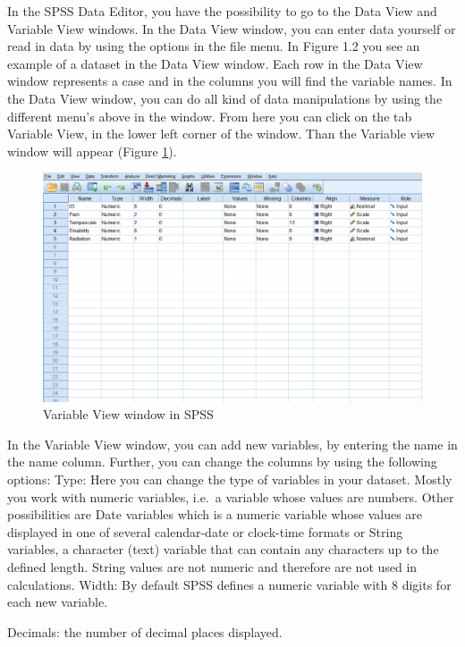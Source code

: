 \documentclass[]{book}
\begin{document}
In the SPSS Data Editor, you have the possibility to go to the Data View
and Variable View windows. In the Data View window, you can enter data
yourself or read in data by using the options in the file menu. In
Figure 1.2 you see an example of a dataset in the Data View window. Each
row in the Data View window represents a case and in the columns you
will find the variable names. In the Data View window, you can do all
kind of data manipulations by using the different menu's above in the
window. From here you can click on the tab Variable View, in the lower
left corner of the window. Than the Variable view window will appear
(Figure \ref{fig:fig3}).

\begin{figure}

{\centering \includegraphics[width=0.9\linewidth]{images/fig1.3} 

}

\caption{Variable View window in SPSS}\label{fig:fig3}
\end{figure}

In the Variable View window, you can add new variables, by entering the
name in the name column. Further, you can change the columns by using
the following options: Type: Here you can change the type of variables
in your dataset. Mostly you work with numeric variables, i.e.~a variable
whose values are numbers. Other possibilities are Date variables which
is a numeric variable whose values are displayed in one of several
calendar-date or clock-time formats or String variables, a character
(text) variable that can contain any characters up to the defined
length. String values are not numeric and therefore are not used in
calculations. Width: By default SPSS defines a numeric variable with 8
digits for each new variable.

Decimals: the number of decimal places displayed.
\end{document}
